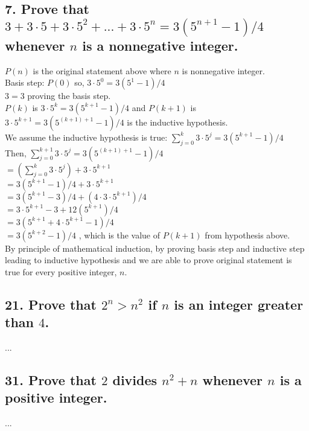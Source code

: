 \documentclass[11pt, oneside]{article} %
\numberwithin{equation}{section} %
\numberwithin{figure}{section} %
\numberwithin{table}{section} %
\begin{document}
\subsection{7. Prove that $3+3\cdot 5+3 \cdot 5^2+...+3 \cdot 5^n=3(5^{n+1} -1)/4$ whenever $n$ is a nonnegative integer.}
$P(n)$ is the original statement above where $n$ is nonnegative integer.\\
Basis step: $P(0)$ so, $3\cdot5^0 = 3(5^1 -1)/4$ \\
$3=3$ proving the basis step. \\
$P(k)$ is $3\cdot5^k = 3(5^{k+1} - 1)/4$
and $P(k+1)$ is $3\cdot5^{k+1} = 3(5^{(k+1)+1} - 1)/4$ is the inductive hypothesis. \\
We assume the inductive hypothesis is true: $\sum_{j=0}^{k} 3\cdot5^j = 3(5^{k+1} -1)/4$ \\
Then, $\sum_{j=0}^{k+1} 3\cdot5^j = 3(5^{(k+1)+1} -1)/4$ \\
$= (\sum_{j=0}^k 3\cdot5^j) + 3\cdot5^{k+1}$ \\
$ = 3(5^{k+1}-1)/4 + 3\cdot5^{k+1}$ \\
$ = 3(5^{k+1}-3)/4 + (4\cdot3\cdot5^{k+1})/4$ \\
$ = 3\cdot5^{k+1} -3 + 12(5^{k+1})/4$ \\
$ = 3(5^{k+1} + 4\cdot5^{k+1} -1)/4$ \\
$ = 3(5^{k+2}-1)/4$ , which is the value of $P(k+1)$ from hypothesis above. \\
By principle of mathematical induction, by proving basis step and inductive step leading to inductive hypothesis and we are able to prove original statement is true for every positive integer, $n$.


\subsection{21. Prove that $2^n > n^2$ if $n$ is an integer greater than $4$.}
...


\subsection{31. Prove that $2$ divides $n^2 + n$ whenever $n$ is a positive integer.}
...
\end{document}
